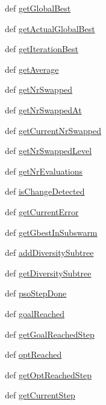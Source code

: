 \begin{CompactItemize}
\item 
def \hyperlink{classpso_1_1PsoStatistics_e0393a49d58d56b74b22182a5db0fded}{getGlobalBest}
\item 
def \hyperlink{classpso_1_1PsoStatistics_87f538a4300099727c60df55d2efa180}{getActualGlobalBest}
\item 
def \hyperlink{classpso_1_1PsoStatistics_c1c589ef976da3b8064b7aee96e0f22c}{getIterationBest}
\item 
def \hyperlink{classpso_1_1PsoStatistics_1277dc1bf425fcaa6872d71e7d504e9a}{getAverage}
\item 
def \hyperlink{classpso_1_1PsoStatistics_559322a9c2e029da60c06bbebaaceb36}{getNrSwapped}
\item 
def \hyperlink{classpso_1_1PsoStatistics_6a7038a05e999d42b240ade930d3d675}{getNrSwappedAt}
\item 
def \hyperlink{classpso_1_1PsoStatistics_3c49d9e7dec249286a975aaaa78acaaa}{getCurrentNrSwapped}
\item 
def \hyperlink{classpso_1_1PsoStatistics_95b0b7388e0f9cccd318718452b8e0b8}{getNrSwappedLevel}
\item 
def \hyperlink{classpso_1_1PsoStatistics_74154723b81c2f1642971359cf4bae41}{getNrEvaluations}
\item 
def \hyperlink{classpso_1_1PsoStatistics_f7745cdca5b73008a5681f848d9ed1a6}{isChangeDetected}
\item 
def \hyperlink{classpso_1_1PsoStatistics_6e1731aa0c3552e53f2d3451021c5b33}{getCurrentError}
\item 
def \hyperlink{classpso_1_1PsoStatistics_f614c406f42d3d721f85172f69231505}{getGbestInSubswarm}
\item 
def \hyperlink{classpso_1_1PsoStatistics_003f25830b997c0bba6e8c842b2c6df1}{addDiversitySubtree}
\item 
def \hyperlink{classpso_1_1PsoStatistics_4dda24bd759eb10fe67b267215b1b70a}{getDiversitySubtree}
\item 
def \hyperlink{classpso_1_1PsoStatistics_032ee275a0df021105cc889a84915cad}{psoStepDone}
\item 
def \hyperlink{classpso_1_1PsoStatistics_752569a04b42d9b117d0fda799968e33}{goalReached}
\item 
def \hyperlink{classpso_1_1PsoStatistics_e6d96d238b58478b13fb8a0ac094afea}{getGoalReachedStep}
\item 
def \hyperlink{classpso_1_1PsoStatistics_8fbbedca5be7957f8120734aa7876d95}{optReached}
\item 
def \hyperlink{classpso_1_1PsoStatistics_f0302c9c2a64baa9b5ae6af5307874e1}{getOptReachedStep}
\item 
def \hyperlink{classpso_1_1PsoStatistics_f594fa00dcb1921bd9c644245d05d9a5}{getCurrentStep}
\end{CompactItemize}
